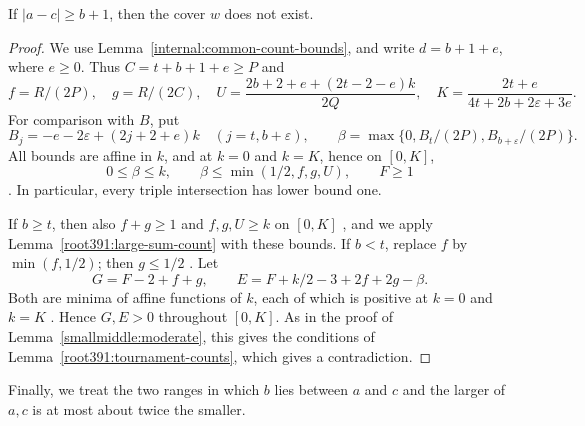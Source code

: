 \begin{lemma}
\label{smallmiddle:large}\label{completeheightthree:separated}
If $|a-c|\ge b+1$, then the cover $w$ does not exist.
\end{lemma}
\begin{proof}
We use Lemma~\ref{internal:common-count-bounds}, and write $d=b+1+e$,
where $e\ge0$. Thus $C=t+b+1+e\ge P$ and
\[
 f=R/(2P),\quad g=R/(2C),\quad
 U=\frac{2b+2+e+(2t-2-e)k}{2Q},\quad
 K=\frac{2t+e}{4t+2b+2\varepsilon+3e}.
\]
For comparison with $B$, put
\[
 B_j=-e-2\varepsilon+(2j+2+e)k
 \quad(j=t,b+\varepsilon),\qquad
 \beta=\max\{0,B_t/(2P),B_{b+\varepsilon}/(2P)\}.
\]
All bounds are affine in $k$, and at $k=0$ and $k=K$, hence on $[0,K]$,
\[
 0\le\beta\le k,\qquad \beta\le\min(1/2,f,g,U),\qquad F\ge1
\]
. In particular, every triple intersection has lower bound one.

If $b\ge t$, then also $f+g\ge1$ and $f,g,U\ge k$ on $[0,K]$ ,
and we apply Lemma~\ref{root391:large-sum-count} with these bounds.
If $b<t$, replace $f$ by $\min(f,1/2)$; then $g\le1/2$ . Let
\[
 G=F-2+f+g,\qquad E=F+k/2-3+2f+2g-\beta.
\]
Both are minima of affine functions of $k$, each of which is positive
at $k=0$ and $k=K$ . Hence $G,E>0$ throughout $[0,K]$.
As in the proof of Lemma~\ref{smallmiddle:moderate}, this gives the conditions of Lemma~\ref{root391:tournament-counts}, which gives a contradiction.
\end{proof}


Finally, we treat the two ranges in which $b$ lies between $a$ and $c$ and the larger of $a,c$ is at most about twice the smaller.

